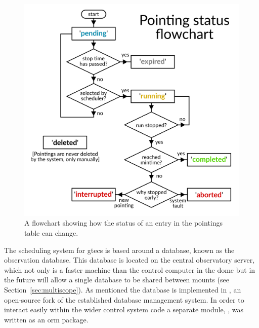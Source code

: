 \begin{colsection}
\begin{colsection}
\begin{figure}[p]
\begin{center}
\includegraphics[width=0.9\linewidth]{images/pointings.pdf}
\end{center}
\caption[Pointings]{A flowchart showing how the status of an entry in the pointings table can change.}
\label{fig:pointings}
\end{figure}

The scheduling system for \gls{gtecs} is based around a  database, known as the observation database. This database is located on the central observatory server, which not only is a faster machine than the control computer in the dome but in the future will allow a single database to be shared between mounts (see Section~\ref{sec:multiscope}). As mentioned the database is implemented in , an open-source fork of the established  database management system. In order to interact easily within the wider control system code a separate  module, , was written as an \gls{orm} package.


\end{colsection}
\end{colsection}
